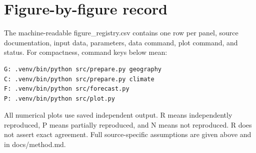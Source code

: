 \documentclass[11pt]{article}
\begin{document}
\section{Figure-by-figure record}
The machine-readable figure\_registry.csv contains one row per panel, source
documentation, input data, parameters, data command, plot command, and status.
For compactness, command keys below mean:
\begin{verbatim}
G: .venv/bin/python src/prepare.py geography
C: .venv/bin/python src/prepare.py climate
F: .venv/bin/python src/forecast.py
P: .venv/bin/python src/plot.py
\end{verbatim}
All numerical plots use saved independent output. R means independently reproduced,
P means partially reproduced, and N means not reproduced. R does not assert exact
agreement. Full source-specific assumptions are given above and in docs/method.md.
\small
\end{document}
